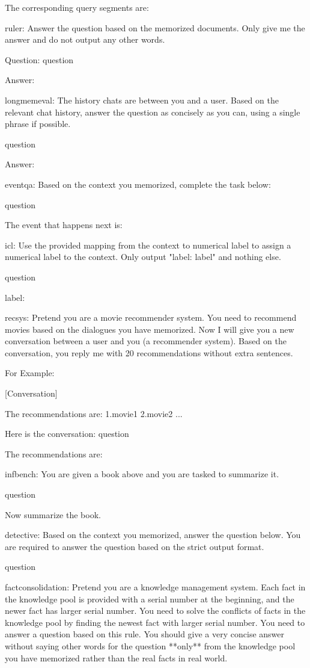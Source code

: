 The corresponding query segments are:

\begin{promptbox}
ruler: Answer the question based on the memorized documents. Only give me the answer and do not output any other words.

Question: {question}

Answer:

longmemeval: The history chats are between you and a user. Based on the relevant chat history, answer the question as concisely as you can, using a single phrase if possible.

{question}

Answer:

eventqa: Based on the context you memorized, complete the task below:

{question}

The event that happens next is:

icl: Use the provided mapping from the context to numerical label to assign a numerical label to the context. Only output "label: {{label}}" and nothing else.

{question}

label:

recsys: Pretend you are a movie recommender system. You need to recommend movies based on the dialogues you have memorized. Now I will give you a new conversation between a user and you (a recommender system). Based on the conversation, you reply me with 20 recommendations without extra sentences.

For Example:

[Conversation]

The recommendations are:
1.movie1
2.movie2
...

Here is the conversation: {question}

The recommendations are:

infbench: You are given a book above and you are tasked to summarize it.

{question}

Now summarize the book.

detective: Based on the context you memorized, answer the question below. You are required to answer the question based on the strict output format.

{question}

factconsolidation: Pretend you are a knowledge management system. Each fact in the knowledge pool is provided with a serial number at the beginning, and the newer fact has larger serial number. You need to solve the conflicts of facts in the knowledge pool by finding the newest fact with larger serial number. You need to answer a question based on this rule. You should give a very concise answer without saying other words for the question **only** from the knowledge pool you have memorized rather than the real facts in real world.


\end{promptbox}
